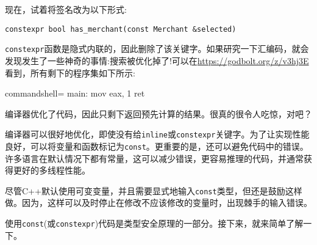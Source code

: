 现在，试着将签名改为以下形式:

\begin{lstlisting}[style=styleCXX]
constexpr bool has_merchant(const Merchant &selected)
\end{lstlisting}

\texttt{constexpr}函数是隐式内联的，因此删除了该关键字。如果研究一下汇编码，就会发现发生了一些神奇的事情:搜索被优化掉了!可以在\url{https://godbolt.org/z/v3hj3E}看到，所有剩下的程序集如下所示:

\begin{tcblisting}{commandshell={}}
main:
    mov eax, 1
    ret
\end{tcblisting}

编译器优化了代码，因此只剩下返回预先计算的结果。很真的很令人吃惊，对吧？


编译器可以很好地优化，即使没有给\texttt{inline}或\texttt{constexpr}关键字。为了让实现性能良好，可以将变量和函数标记为\texttt{const}。更重要的是，还可以避免代码中的错误。许多语言在默认情况下都有常量，这可以减少错误，更容易推理的代码，并通常获得更好的多线程性能。

尽管C++默认使用可变变量，并且需要显式地输入\texttt{const}类型，但还是鼓励这样做。因为，这样可以及时停止在修改不应该修改的变量时，出现棘手的输入错误。

使用\texttt{const}(或\texttt{constexpr})代码是类型安全原理的一部分。接下来，就来简单了解一下。











